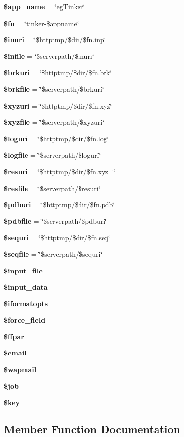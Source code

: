 \begin{CompactItemize}
\item 
{\bf \$app\_\-name} = \char`\"{}eg\-Tinker\char`\"{}
\item 
{\bf \$fn} = \char`\"{}tinker-\$appname\char`\"{}
\item 
{\bf \$inuri} = \char`\"{}\$httptmp/\$dir/\$fn.inp\char`\"{}
\item 
{\bf \$infile} = \char`\"{}\$serverpath/\$inuri\char`\"{}
\item 
{\bf \$brkuri} = \char`\"{}\$httptmp/\$dir/\$fn.brk\char`\"{}
\item 
{\bf \$brkfile} = \char`\"{}\$serverpath/\$brkuri\char`\"{}
\item 
{\bf \$xyzuri} = \char`\"{}\$httptmp/\$dir/\$fn.xyz\char`\"{}
\item 
{\bf \$xyzfile} = \char`\"{}\$serverpath/\$xyzuri\char`\"{}
\item 
{\bf \$loguri} = \char`\"{}\$httptmp/\$dir/\$fn.log\char`\"{}
\item 
{\bf \$logfile} = \char`\"{}\$serverpath/\$loguri\char`\"{}
\item 
{\bf \$resuri} = \char`\"{}\$httptmp/\$dir/\$fn.xyz\_\char`\"{}
\item 
{\bf \$resfile} = \char`\"{}\$serverpath/\$resuri\char`\"{}
\item 
{\bf \$pdburi} = \char`\"{}\$httptmp/\$dir/\$fn.pdb\char`\"{}
\item 
{\bf \$pdbfile} = \char`\"{}\$serverpath/\$pdburi\char`\"{}
\item 
{\bf \$sequri} = \char`\"{}\$httptmp/\$dir/\$fn.seq\char`\"{}
\item 
{\bf \$seqfile} = \char`\"{}\$serverpath/\$sequri\char`\"{}
\item 
{\bf \$input\_\-file}
\item 
{\bf \$input\_\-data}
\item 
{\bf \$iformatopts}
\item 
{\bf \$force\_\-field}
\item 
{\bf \$ffpar}
\item 
{\bf \$email}
\item 
{\bf \$wapmail}
\item 
{\bf \$job}
\item 
{\bf \$key}
\end{CompactItemize}


\subsection{Member Function Documentation}
